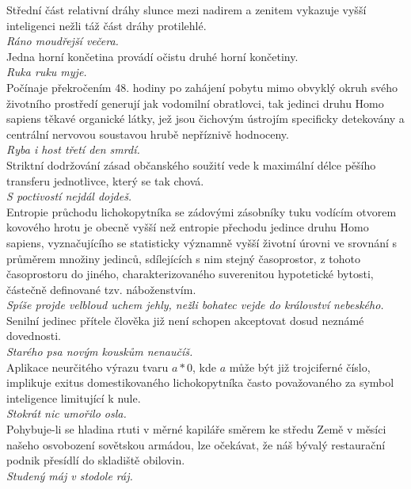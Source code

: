 \begin{multicols}{2}
\noindent
Střední část relativní dráhy slunce mezi nadirem a zenitem vykazuje
vyšší inteligenci nežli táž část dráhy protilehlé.\\[1 mm]
{\sl Ráno moudřejší večera.}\\

\noindent
Jedna horní končetina provádí očistu druhé horní končetiny.\\[1 mm]
{\sl Ruka ruku myje.}\\

\noindent
Počínaje překročením 48. hodiny po zahájení pobytu mimo obvyklý
okruh svého životního prostředí generují jak vodomilní obratlovci,
tak jedinci druhu Homo sapiens těkavé organické látky, jež jsou
čichovým ústrojím specificky detekovány a centrální nervovou
soustavou hrubě nepříznivě hodnoceny.\\[1 mm]
{\sl Ryba i host třetí den smrdí.}\\

\noindent
Striktní dodržování zásad občanského soužití vede k maximální
délce pěšího transferu jednotlivce, který se tak chová.\\[1 mm]
{\sl S poctivostí nejdál dojdeš.}\\

\noindent
Entropie průchodu lichokopytníka se zádovými zásobníky tuku
vodícím otvorem kovového hrotu je obecně vyšší než entropie přechodu
jedince druhu Homo sapiens, vyznačujícího se statisticky významně
vyšší životní úrovni ve srovnání s průměrem množiny jedinců,
sdílejících s nim stejný časoprostor, z tohoto časoprostoru do
jiného, charakterizovaného suverenitou hypotetické bytosti, částečně
definované tzv. náboženstvím.\\[1 mm]
{\sl Spíše projde velbloud uchem jehly, nežli bohatec vejde do
království nebeského.}\\

\noindent
Senilní jedinec přítele člověka již není schopen akceptovat
dosud neznámé dovednosti.\\[1 mm]
{\sl Starého psa novým kouskům nenaučíš.}\\

\noindent
Aplikace neurčitého výrazu tvaru $a*0$, kde $a$ může být již
trojciferné číslo, implikuje exitus domestikovaného lichokopytníka
často považovaného za symbol inteligence limitující k nule.\\[1 mm]
{\sl Stokrát nic umořilo osla.}\\

\noindent
Pohybuje-li se hladina rtuti v měrné kapiláře směrem ke středu
Země v měsíci našeho osvobození sovětskou armádou, lze očekávat,
že náš bývalý restaurační podnik přesídlí do skladiště obilovin.\\[1 mm]
{\sl Studený máj v stodole ráj.}\\


\end{multicols}
